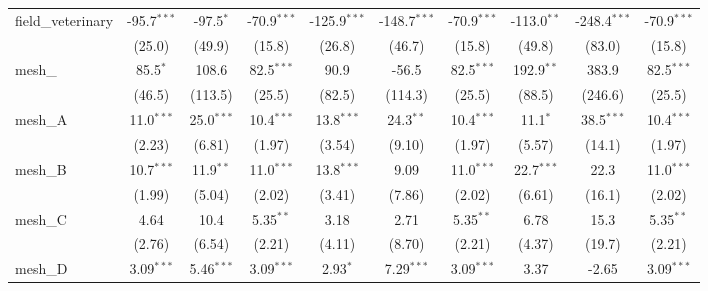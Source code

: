 \begin{tabular}{lccccccccc}
   field\_veterinary                                           & -95.7$^{***}$  & -97.5$^{*}$    & -70.9$^{***}$ & -125.9$^{***}$ & -148.7$^{***}$ & -70.9$^{***}$ & -113.0$^{**}$  & -248.4$^{***}$ & -70.9$^{***}$\\   
                                                               & (25.0)         & (49.9)         & (15.8)        & (26.8)         & (46.7)         & (15.8)        & (49.8)         & (83.0)         & (15.8)\\   
   mesh\_                                                      & 85.5$^{*}$     & 108.6          & 82.5$^{***}$  & 90.9           & -56.5          & 82.5$^{***}$  & 192.9$^{**}$   & 383.9          & 82.5$^{***}$\\   
                                                               & (46.5)         & (113.5)        & (25.5)        & (82.5)         & (114.3)        & (25.5)        & (88.5)         & (246.6)        & (25.5)\\   
   mesh\_A                                                     & 11.0$^{***}$   & 25.0$^{***}$   & 10.4$^{***}$  & 13.8$^{***}$   & 24.3$^{**}$    & 10.4$^{***}$  & 11.1$^{*}$     & 38.5$^{***}$   & 10.4$^{***}$\\   
                                                               & (2.23)         & (6.81)         & (1.97)        & (3.54)         & (9.10)         & (1.97)        & (5.57)         & (14.1)         & (1.97)\\   
   mesh\_B                                                     & 10.7$^{***}$   & 11.9$^{**}$    & 11.0$^{***}$  & 13.8$^{***}$   & 9.09           & 11.0$^{***}$  & 22.7$^{***}$   & 22.3           & 11.0$^{***}$\\   
                                                               & (1.99)         & (5.04)         & (2.02)        & (3.41)         & (7.86)         & (2.02)        & (6.61)         & (16.1)         & (2.02)\\   
   mesh\_C                                                     & 4.64           & 10.4           & 5.35$^{**}$   & 3.18           & 2.71           & 5.35$^{**}$   & 6.78           & 15.3           & 5.35$^{**}$\\   
                                                               & (2.76)         & (6.54)         & (2.21)        & (4.11)         & (8.70)         & (2.21)        & (4.37)         & (19.7)         & (2.21)\\   
   mesh\_D                                                     & 3.09$^{***}$   & 5.46$^{***}$   & 3.09$^{***}$  & 2.93$^{*}$     & 7.29$^{***}$   & 3.09$^{***}$  & 3.37           & -2.65          & 3.09$^{***}$\\   

\end{tabular}
